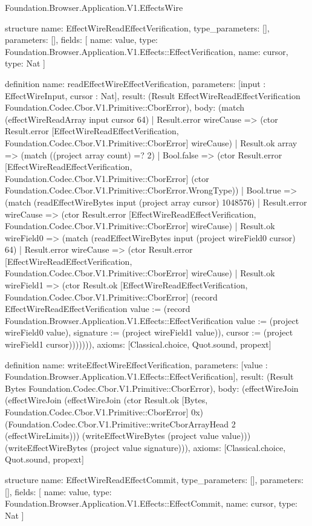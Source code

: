 \begin{lexlean}{Foundation.Browser.Application.V1.EffectsWire}
\begin{semanticmodule}
structure{
  name: EffectWireReadEffectVerification,
  type_parameters: [],
  parameters: [],
  fields: [
    {name: value, type: Foundation.Browser.Application.V1.Effects::EffectVerification},
    {name: cursor, type: Nat}
  ]
}

definition{
  name: readEffectWireEffectVerification,
  parameters: [input : EffectWireInput, cursor : Nat],
  result: (Result EffectWireReadEffectVerification Foundation.Codec.Cbor.V1.Primitive::CborError),
  body: (match (effectWireReadArray input cursor 64)
    | Result.error wireCause => (ctor Result.error [EffectWireReadEffectVerification, Foundation.Codec.Cbor.V1.Primitive::CborError] wireCause)
    | Result.ok array => (match ((project array count) =? 2)
      | Bool.false => (ctor Result.error [EffectWireReadEffectVerification, Foundation.Codec.Cbor.V1.Primitive::CborError] (ctor Foundation.Codec.Cbor.V1.Primitive::CborError.WrongType))
      | Bool.true => (match (readEffectWireBytes input (project array cursor) 1048576)
        | Result.error wireCause => (ctor Result.error [EffectWireReadEffectVerification, Foundation.Codec.Cbor.V1.Primitive::CborError] wireCause)
        | Result.ok wireField0 => (match (readEffectWireBytes input (project wireField0 cursor) 64)
          | Result.error wireCause => (ctor Result.error [EffectWireReadEffectVerification, Foundation.Codec.Cbor.V1.Primitive::CborError] wireCause)
          | Result.ok wireField1 => (ctor Result.ok [EffectWireReadEffectVerification, Foundation.Codec.Cbor.V1.Primitive::CborError] (record EffectWireReadEffectVerification {value := (record Foundation.Browser.Application.V1.Effects::EffectVerification {value := (project wireField0 value), signature := (project wireField1 value)}), cursor := (project wireField1 cursor)})))))),
  axioms: [Classical.choice, Quot.sound, propext]
}

definition{
  name: writeEffectWireEffectVerification,
  parameters: [value : Foundation.Browser.Application.V1.Effects::EffectVerification],
  result: (Result Bytes Foundation.Codec.Cbor.V1.Primitive::CborError),
  body: (effectWireJoin (effectWireJoin (effectWireJoin (ctor Result.ok [Bytes, Foundation.Codec.Cbor.V1.Primitive::CborError] 0x) (Foundation.Codec.Cbor.V1.Primitive::writeCborArrayHead 2 (effectWireLimits))) (writeEffectWireBytes (project value value))) (writeEffectWireBytes (project value signature))),
  axioms: [Classical.choice, Quot.sound, propext]
}

structure{
  name: EffectWireReadEffectCommit,
  type_parameters: [],
  parameters: [],
  fields: [
    {name: value, type: Foundation.Browser.Application.V1.Effects::EffectCommit},
    {name: cursor, type: Nat}
  ]
}


\end{semanticmodule}
\end{lexlean}
